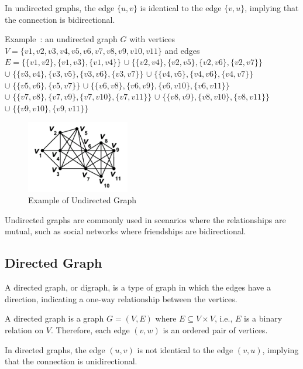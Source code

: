 In undirected graphs, the edge $\{u, v\}$ is identical to the edge $\{v, u\}$, implying that the connection is bidirectional.

Example~\cite{mdwikipedia}: an undirected graph $G$ with vertices $V = \{v1, v2, v3, v4, v5, v6, v7, v8, v9, v10, v11\}$ and edges \\
$E= \{\{v1, v2\}, \{v1, v3\}, \{v1, v4\}\}$
$\cup \; \{\{v2, v4\}, \{v2, v5\}, \{v2, v6\}, \{v2, v7\}\}$ \\
$\cup \; \{\{v3, v4\}, \{v3, v5\}, \{v3, v6\}, \{v3, v7\}\}$
$\cup \; \{\{v4, v5\}, \{v4, v6\}, \{v4, v7\}\}$
$\cup \; \{\{v5, v6\}, \{v5, v7\}\}$
$\cup \; \{\{v6, v8\}, \{v6, v9\}, \{v6, v10\}, \{v6, v11\}\}$
$\cup \; \{\{v7, v8\}, \{v7, v9\}, \{v7, v10\}, \{v7, v11\}\}$
$\cup \; \{\{v8, v9\}, \{v8, v10\}, \{v8, v11\}\}$
$\cup \; \{\{v9, v10\}, \{v9, v11\}\}$


\begin{figure}[!h]
    \centering
    \includegraphics[width=0.40\textwidth]{images/graphs/undirected_graph_wikipedia}
    \caption{Example of Undirected Graph}
    \label{fig:example-undirected-graph}
\end{figure}

Undirected graphs are commonly used in scenarios where the relationships are mutual, such as social networks where friendships are bidirectional.

\subsection*{Directed Graph}\label{subsec:directed-graph}

A directed graph, or digraph, is a type of graph in which the edges have a direction, indicating a one-way relationship between the vertices.

A directed graph is a graph $G = (V, E)$ where $E \subseteq V \times V$, i.e., $E$ is a binary relation on $V$.
Therefore, each edge $(v, w)$ is an ordered pair of vertices.

In directed graphs, the edge $(u, v)$ is not identical to the edge $(v, u)$, implying that the connection is unidirectional.

